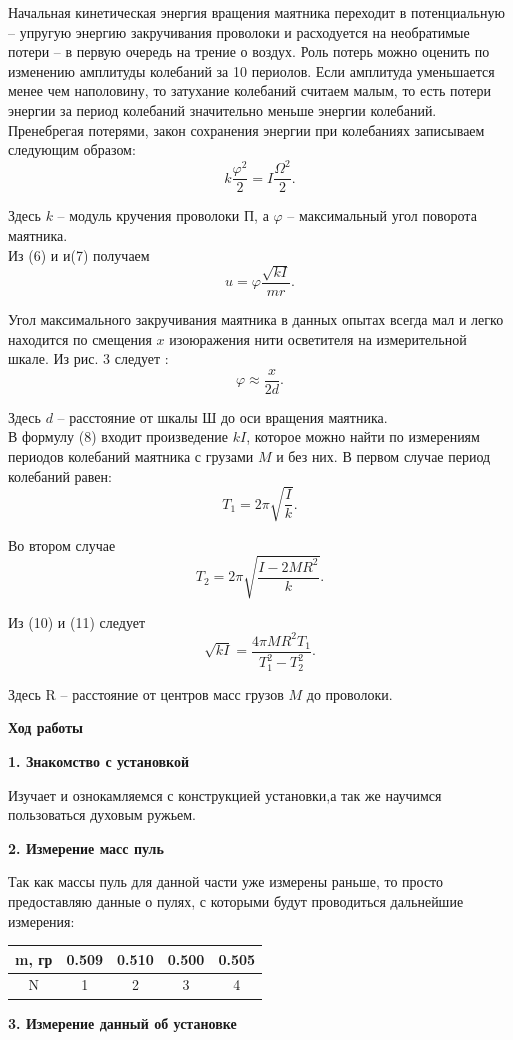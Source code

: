 \documentclass[a4paper,12pt]{article} %
\begin{document}
Начальная кинетическая энергия вращения маятника переходит в потенциальную -- упругую энергию закручивания проволоки и расходуется на необратимые потери -- в первую очередь на трение о воздух. Роль потерь можно оценить по изменению амплитуды колебаний за 10 периолов. Если амплитуда уменьшается менее чем наполовину, то затухание колебаний считаем малым, то есть потери энергии за период колебаний значительно меньше энергии колебаний. Пренебрегая потерями, закон сохранения энергии при колебаниях записываем следующим образом: \[ k\frac{\varphi^2}{2} = I\frac{\Omega^2}{2}.\]

Здесь $k$ -- модуль кручения проволоки П, а $\varphi$ -- максимальный угол поворота маятника.\\
Из (6) и и(7) получаем \[ u = \varphi\frac{\sqrt{kI}}{mr}.\]

Угол максимального закручивания маятника в данных опытах всегда мал  и легко находится по смещения $x$ изоюражения нити осветителя на измерительной шкале. Из рис. 3 следует : \[ \varphi \approx \frac{x}{2d}.\]

Здесь $d$ -- расстояние от шкалы Ш до оси вращения маятника.\\
В формулу (8) входит произведение $kI$, которое можно найти по измерениям периодов колебаний маятника с грузами $M$ и без них. В первом случае период колебаний равен: \[ T_1 = 2\pi \sqrt{\frac{I}{k}}.\]

Во втором случае \[ T_2 = 2\pi \sqrt{\frac{I - 2MR^2}{k}}.\]

Из (10) и (11) следует \[ \sqrt{kI} = \frac{4\pi MR^2T_1}{T_1^2 - T_2^2}.\]

Здесь R -- расстояние от центров масс грузов $M$ до проволоки.

\begin{center}
{\bf Ход работы}
\end{center}
\begin{center}
{\bf 1. Знакомство с установкой}
\end{center}

Изучает и ознокамляемся с конструкцией установки,а так же научимся пользоваться духовым ружьем.
\begin{center}
{\bf 2. Измерение масс пуль}
\end{center}

Так как массы пуль для данной части уже измерены раньше, то просто предоставляю данные о пулях, с которыми будут проводиться дальнейшие измерения:  

\begin{center}
\begin{tabular}{|c|c|c|c|c|}
\hline 
m, гр & 0.509 & 0.510 & 0.500 & 0.505\\ 
\hline 
N & 1 & 2 & 3 & 4\\ 
\hline 
\end{tabular} 
\end{center}
\begin{center}
{\bf 3. Измерение данный об установке}
\end{center}
\end{document}
